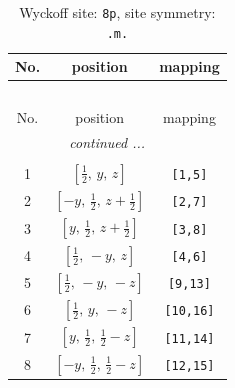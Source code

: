 \documentclass[fleqn,8pt]{jsarticle}
\begin{document}
\begin{longtable}{ccc}
\caption{Wyckoff site: {\tt 8p}, site symmetry: {\tt .m.}}
 \\
 \hline \hline
No. & position & mapping \\ \hline \endfirsthead

\multicolumn{2}{l}{\tablename\ \thetable{}} \\
 \hline \hline
No. & position & mapping \\ \hline \endhead

 \hline \hline
\multicolumn{2}{r}{\footnotesize\it continued ...} \\ \endfoot

 \hline \hline
\multicolumn{2}{r}{} \\ \endlastfoot

1 & $\left[ \frac{1}{2},\, y,\, z \right]$ & {\tt [1,5]} \\ \hline
2 & $\left[ - y,\, \frac{1}{2},\, z + \frac{1}{2} \right]$ & {\tt [2,7]} \\ \hline
3 & $\left[ y,\, \frac{1}{2},\, z + \frac{1}{2} \right]$ & {\tt [3,8]} \\ \hline
4 & $\left[ \frac{1}{2},\, - y,\, z \right]$ & {\tt [4,6]} \\ \hline
5 & $\left[ \frac{1}{2},\, - y,\, - z \right]$ & {\tt [9,13]} \\ \hline
6 & $\left[ \frac{1}{2},\, y,\, - z \right]$ & {\tt [10,16]} \\ \hline
7 & $\left[ y,\, \frac{1}{2},\, \frac{1}{2} - z \right]$ & {\tt [11,14]} \\ \hline
8 & $\left[ - y,\, \frac{1}{2},\, \frac{1}{2} - z \right]$ & {\tt [12,15]} \\
\end{longtable}
\renewcommand{\arraystretch}{1.2}
\end{document}
